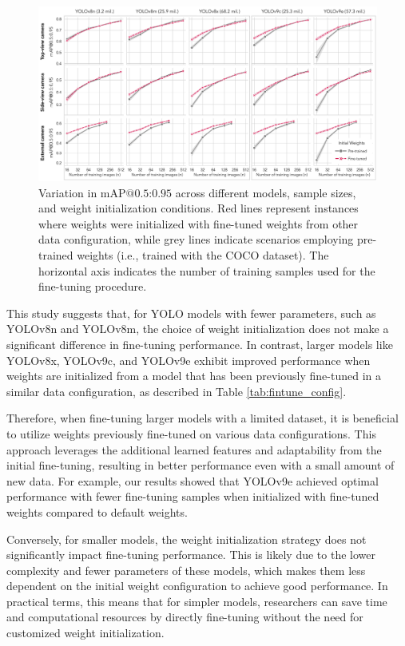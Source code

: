 \begin{figure}[h]
    \centering
    \includegraphics[width=1\textwidth]{figure_5.jpg}
    \caption{Variation in $\text{mAP@{0.5:0.95}}$ across different models, sample sizes, and weight initialization conditions. Red lines represent instances where weights were initialized with fine-tuned weights from other data configuration, while grey lines indicate scenarios employing pre-trained weights (i.e., trained with the COCO dataset). The horizontal axis indicates the number of training samples used for the fine-tuning procedure.}
    \label{fig:finetune}
\end{figure}

This study suggests that, for YOLO models with fewer parameters, such as YOLOv8n and YOLOv8m, the choice of weight initialization does not make a significant difference in fine-tuning performance. In contrast, larger models like YOLOv8x, YOLOv9c, and YOLOv9e exhibit improved performance when weights are initialized from a model that has been previously fine-tuned in a similar data configuration, as described in Table \ref{tab:fintune_config}.

Therefore, when fine-tuning larger models with a limited dataset, it is beneficial to utilize weights previously fine-tuned on various data configurations. This approach leverages the additional learned features and adaptability from the initial fine-tuning, resulting in better performance even with a small amount of new data. For example, our results showed that YOLOv9e achieved optimal performance with fewer fine-tuning samples when initialized with fine-tuned weights compared to default weights.

Conversely, for smaller models, the weight initialization strategy does not significantly impact fine-tuning performance. This is likely due to the lower complexity and fewer parameters of these models, which makes them less dependent on the initial weight configuration to achieve good performance. In practical terms, this means that for simpler models, researchers can save time and computational resources by directly fine-tuning without the need for customized weight initialization.

